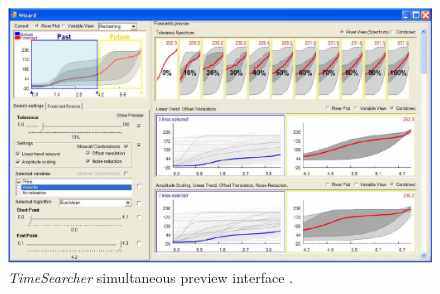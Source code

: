 \documentclass[electronic]{vgtc}             %
\begin{document}
\begin{figure}[!b]
	\centering
	\includegraphics[width=\columnwidth]{TimeSearcher}
	\caption{\textit{TimeSearcher} simultaneous preview interface \cite{buono:2007}.
	}
	\label{fig:timesearcher}
\end{figure}
\end{document}
